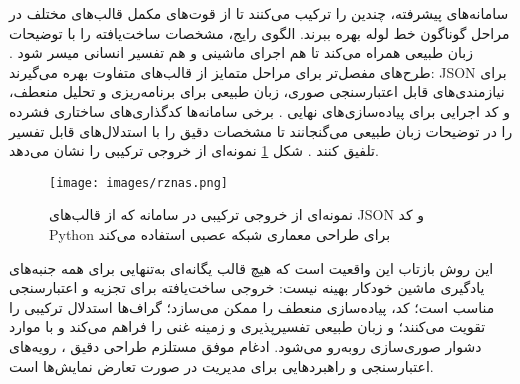 سامانه‌های پیشرفته، چندین  را ترکیب می‌کنند تا از قوت‌های مکمل قالب‌های مختلف در مراحل گوناگون خط لوله بهره ببرند. الگوی رایج، مشخصات ساخت‌یافته را با توضیحات زبان طبیعی همراه می‌کند تا هم اجرای ماشینی و هم تفسیر انسانی میسر شود \cite{liu2025agenthpo, zhang2023usingLLMforHPO}. طرح‌های مفصل‌تر برای مراحل متمایز از قالب‌های متفاوت بهره می‌گیرند: JSON برای نیازمندی‌های قابل اعتبارسنجی صوری، زبان طبیعی برای برنامه‌ریزی و تحلیل منعطف، و کد اجرایی برای پیاده‌سازی‌های نهایی \cite{trirat2025automlagent, zhang2023AutomlGPTAutomaticMachineLearning}. برخی سامانه‌ها کدگذاری‌های ساختاری فشرده را در توضیحات زبان طبیعی می‌گنجانند تا مشخصات دقیق را با استدلال‌های قابل تفسیر تلفیق کنند \cite{ji2025RZNAS, Yang2025NADER}. شکل \ref{fig:rznas} نمونه‌ای از خروجی ترکیبی را نشان می‌دهد.
\begin{figure}[h!]
    \centering
    \texttt{[image: images/rznas.png]}
    \caption[نمونه ای از خروجی ترکیبی واژنامه‌ای و کد]{
        نمونه‌ای از خروجی ترکیبی در سامانه  که از قالب‌های JSON و کد Python برای طراحی معماری شبکه عصبی استفاده می‌کند \cite{ji2025RZNAS}
    }
    \label{fig:rznas}
\end{figure}
این روش بازتاب این واقعیت است که هیچ قالب یگانه‌ای به‌تنهایی برای همه جنبه‌های یادگیری ماشین خودکار بهینه نیست: خروجی ساخت‌یافته برای تجزیه و اعتبارسنجی مناسب است؛ کد، پیاده‌سازی منعطف را ممکن می‌سازد؛ گراف‌ها استدلال ترکیبی را تقویت می‌کنند؛ و زبان طبیعی تفسیرپذیری و زمینه غنی را فراهم می‌کند و با موارد دشوار صوری‌سازی روبه‌رو می‌شود. ادغام موفق مستلزم طراحی دقیق ، رویه‌های اعتبارسنجی  و راهبردهایی برای مدیریت  در صورت تعارض نمایش‌ها است.